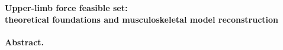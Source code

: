 

\clearpage
\begin{center}
    \textbf{Upper-limb force feasible set:}\\ 
    \textbf{theoretical foundations and musculoskeletal model reconstruction}
\end{center}
\paragraph*{Abstract.} 

